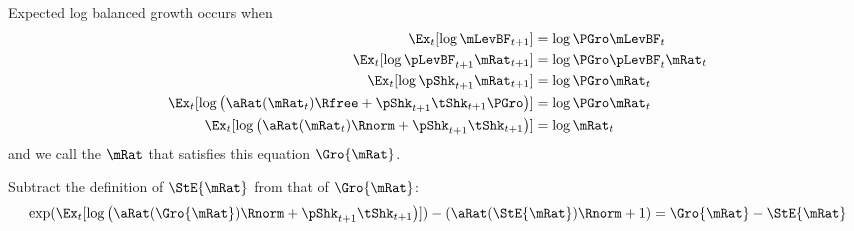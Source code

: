 \documentclass[\econtexRoot/BufferStockTheory]{subfiles}
\begin{document}
Expected log balanced growth occurs when
\begin{equation}\begin{split}
    \Ex_{t}[\log \mLevBF_{t+1}] & = \log \PGro \mLevBF_{t}
\\      \Ex_{t}[\log \pLevBF_{t+1}\mRat_{t+1}] & = \log \PGro \pLevBF_{t} \mRat_{t}
\\      \Ex_{t}[\log \pShk_{t+1}\mRat_{t+1}] & = \log \PGro \mRat_{t}
\\      \Ex_{t}[\log \left(\aRat(\mRat_{t})\Rfree+\pShk_{t+1}\tShk_{t+1}\PGro\right)] & = \log \PGro \mRat_{t}
\\      \Ex_{t}[\log \left(\aRat(\mRat_{t})\Rnorm+\pShk_{t+1}\tShk_{t+1}\right)] & = \log \mRat_{t}
\end{split}\end{equation}
and we call the $\mRat$ that satisfies this equation $\Gro{\mRat}$.

Subtract the definition of $\StE{\mRat}$ from that of $\Gro{\mRat}$:
\begin{equation}\begin{split}
    \exp(\Ex_{t}[\log \left(\aRat(\Gro{\mRat})\Rnorm+\pShk_{t+1}\tShk_{t+1}\right)]) - (\aRat(\StE{\mRat})\Rnorm+1 ) = \Gro{\mRat} - \StE{\mRat}
\end{split}\end{equation}
\end{document}
